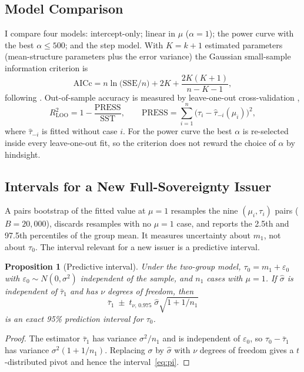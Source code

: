\documentclass[11pt,letterpaper]{article}
\theoremstyle{definition}
\theoremstyle{plain}
\newtheorem{proposition}[definition]{Proposition}
\begin{document}
\subsection{Model Comparison}\label{sec:modelcomp}
I compare four models: intercept-only; linear in $\mu$ ($\alpha=1$); the power curve with the best $\alpha\le500$; and the step model. With $K=k+1$ estimated parameters (mean-structure parameters plus the error variance) the Gaussian small-sample information criterion is
\begin{equation}
\mathrm{AICc}=n\ln\!\big(\mathrm{SSE}/n\big)+2K+\frac{2K(K+1)}{n-K-1},\label{eq:aicc}
\end{equation}
following \citet{hurvich1989}. Out-of-sample accuracy is measured by leave-one-out cross-validation \citep{stone1974},
\begin{equation}
R^2_{\mathrm{LOO}}=1-\frac{\mathrm{PRESS}}{\mathrm{SST}},\qquad \mathrm{PRESS}=\sum_{i=1}^{n}\big(\tau_i-\hat\tau_{-i}(\mu_i)\big)^2,\label{eq:loo}
\end{equation}
where $\hat\tau_{-i}$ is fitted without case $i$. For the power curve the best $\alpha$ is re-selected inside every leave-one-out fit, so the criterion does not reward the choice of $\alpha$ by hindsight.

\subsection{Intervals for a New Full-Sovereignty Issuer}\label{sec:intervalsmeth}
A pairs bootstrap of the fitted value at $\mu=1$ resamples the nine $(\mu_i,\tau_i)$ pairs ($B=20{,}000$), discards resamples with no $\mu=1$ case, and reports the 2.5th and 97.5th percentiles of the group mean. It measures uncertainty about $m_1$, not about $\tau_0$. The interval relevant for a new issuer is a predictive interval.

\begin{proposition}[Predictive interval]\label{prop:pi}
Under the two-group model, $\tau_0=m_1+\varepsilon_0$ with $\varepsilon_0\sim N(0,\sigma^2)$ independent of the sample, and $n_1$ cases with $\mu=1$. If $\hat\sigma$ is independent of $\bar\tau_1$ and has $\nu$ degrees of freedom, then
\begin{equation}
\bar\tau_{1}\;\pm\;t_{\nu,\,0.975}\;\hat\sigma\sqrt{1+1/n_1}\label{eq:pi}
\end{equation}
is an exact 95\% prediction interval for $\tau_0$.
\end{proposition}

\begin{proof}
The estimator $\bar\tau_1$ has variance $\sigma^2/n_1$ and is independent of $\varepsilon_0$, so $\tau_0-\bar\tau_1$ has variance $\sigma^2(1+1/n_1)$. Replacing $\sigma$ by $\hat\sigma$ with $\nu$ degrees of freedom gives a $t$-distributed pivot and hence the interval~\eqref{eq:pi}.
\end{proof}
\end{document}
